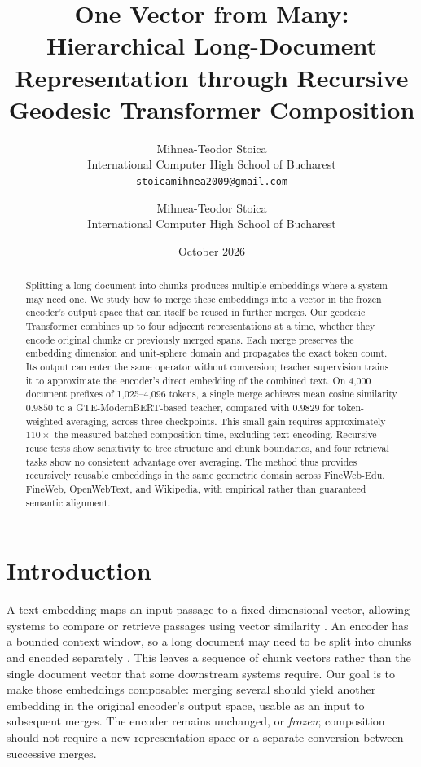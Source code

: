 \documentclass[10pt]{article}
\title{One Vector from Many: Hierarchical Long-Document Representation through Recursive Geodesic Transformer Composition}
\author{Mihnea-Teodor Stoica\\
International Computer High School of Bucharest\\
\texttt{stoicamihnea2009@gmail.com}}
\author{
\name Mihnea-Teodor Stoica\\
\addr International Computer High School of Bucharest
}
\date{October 2026}
\begin{document}
\maketitle

\begin{abstract}
Splitting a long document into chunks produces multiple embeddings where a
system may need one. We study how to merge these embeddings into a vector
in the frozen encoder's output space that can itself be reused in further
merges. Our geodesic Transformer combines up to four adjacent representations
at a time, whether they encode original chunks or previously merged spans.
Each merge preserves the embedding dimension and unit-sphere domain and
propagates the exact token count. Its output can enter the same operator
without conversion; teacher supervision trains it to approximate the encoder's
direct embedding of the combined text. On 4,000 document
prefixes of 1,025--4,096 tokens, a single merge achieves mean cosine similarity
\(0.9850\) to a GTE-ModernBERT-based teacher, compared with \(0.9829\)
for token-weighted averaging,
across three checkpoints. This small gain requires approximately \(110\times\)
the measured batched composition time, excluding text encoding. Recursive
reuse tests show sensitivity to tree structure and chunk boundaries, and four
retrieval tasks show no consistent advantage over averaging. The method thus
provides recursively reusable embeddings in the same geometric domain across
FineWeb-Edu, FineWeb, OpenWebText, and Wikipedia, with
empirical rather than guaranteed semantic alignment.
\end{abstract}

\section{Introduction}

A text embedding maps an input passage to a fixed-dimensional vector, allowing
systems to compare or retrieve passages using vector similarity
\citep{reimers-gurevych-2019-sentence}. An encoder has a bounded context window,
so a long document may need to be split into chunks and encoded separately
\citep{gunther-etal-2023-jina-embeddings-2,dai-etal-2022-revisiting}. This leaves
a sequence of chunk vectors rather than the single document vector that some
downstream systems require. Our goal is to make those embeddings composable:
merging several should yield another embedding in the original encoder's
output space, usable as an input to subsequent merges. The encoder remains
unchanged, or \emph{frozen}; composition should not require a new representation
space or a separate conversion between successive merges.
\end{document}
